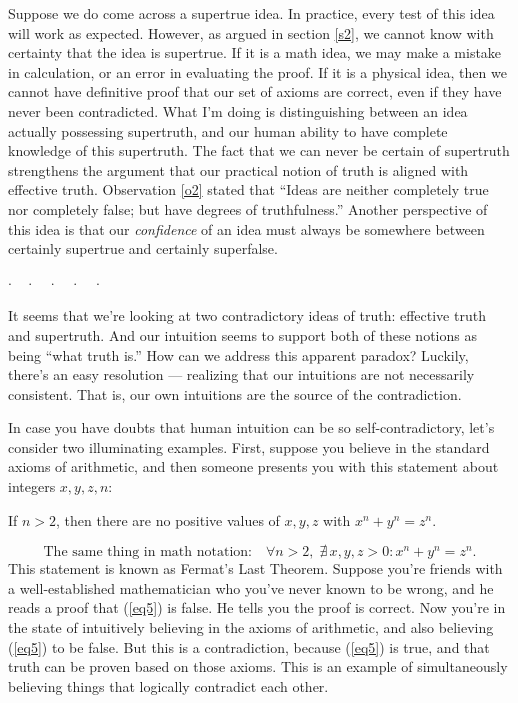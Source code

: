 \documentclass[11pt, oneside]{article}
\theoremstyle{argtstyle}
\newcommand{\dotq}{\cdot\quad}
\newcommand{\scenebreak}{
    \medskip\centerline{$\dotq\dotq\dotq\dotq\cdot$}\medskip
}
\begin{document}
Suppose we do come across a supertrue idea. In practice, every test of this idea
will work as expected.
However, as argued in section \ref{s2}, we cannot know with certainty that
the idea is supertrue. If it is a math idea, we may make a mistake in
calculation, or an error in evaluating the proof. If it is a physical idea, then
we cannot have definitive proof that our set of axioms are correct, even if they
have never been contradicted. What I'm doing is distinguishing between an idea
actually possessing supertruth, and our human ability to have complete knowledge
of this supertruth. The fact that we can never be certain of supertruth
strengthens the argument that our practical notion of truth is aligned with
effective truth. Observation \ref{o2} stated that ``Ideas
are neither completely true nor completely false; but have degrees
of truthfulness.''
Another perspective of this idea is that
our {\em confidence} of an idea must always be somewhere between certainly
supertrue and certainly superfalse.

\scenebreak

It seems that we're looking at two contradictory ideas of truth: effective
truth and supertruth. And our intuition seems to support both of these notions
as being ``what truth is.'' How can we address this apparent paradox?
Luckily, there's an easy resolution --- realizing that our intuitions are not
necessarily consistent. That is, our own intuitions are the source of the
contradiction.

In case you have doubts that human intuition can be so self-contradictory, let's
consider two illuminating examples. First, suppose you believe in the standard
axioms of arithmetic, and then someone presents you with this statement about
integers $x,y,z,n$:
\begin{center}
    If $n>2$, then there are no positive values of $x,y,z$ with
    $x^n+y^n=z^n$.
\end{center}
\begin{equation}\label{eq5}
    \text{The same thing in math notation:}\quad
    \forall n>2,\; \nexists\, x,y,z>0: x^n + y^n = z^n.
\end{equation}
This statement is known as Fermat's Last Theorem.
Suppose you're friends with a well-established mathematician who you've never
known to be wrong, and he reads a proof that (\ref{eq5}) is false. He tells you
the proof is correct.
Now you're in the state of intuitively believing in the axioms of arithmetic,
and also believing (\ref{eq5}) to be false.
But this is a contradiction, because
(\ref{eq5}) is true, and that truth can be proven based on those axioms. This is
an example of simultaneously believing things that logically contradict each
other.
\end{document}
